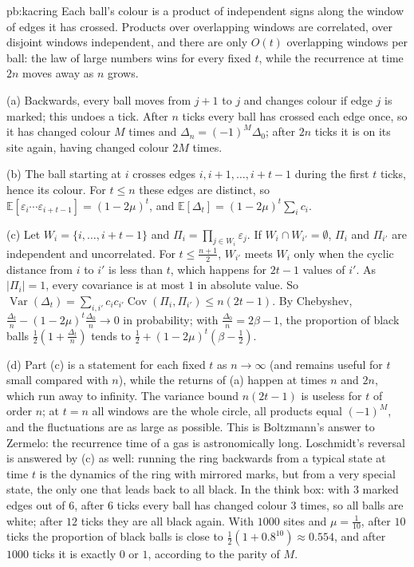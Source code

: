 \begin{solution}{pb:kacring}
\idea Each ball's colour is a product of independent signs along the window of edges it has crossed. Products over overlapping windows
are correlated, over disjoint windows independent, and there are only $O(t)$ overlapping windows per ball: the law of large numbers wins
for every fixed $t$, while the recurrence at time $2n$ moves away as $n$ grows.

\writeup (a) Backwards, every ball moves from $j+1$ to $j$ and changes colour if edge $j$ is marked; this undoes a tick. After $n$ ticks every ball has
crossed each edge once, so it has changed colour $M$ times and $\Delta_n=(-1)^M\Delta_0$; after $2n$ ticks it is on its site again, having changed colour $2M$ times.

(b) The ball starting at $i$ crosses edges $i,i+1,\dots,i+t-1$ during the first $t$ ticks, hence its colour. For $t\le n$ these edges are distinct, so
$\mathbb E[\varepsilon_i\cdots\varepsilon_{i+t-1}]=(1-2\mu)^t$, and $\mathbb E[\Delta_t]=(1-2\mu)^t\sum_ic_i$.

(c) Let $W_i=\{i,\dots,i+t-1\}$ and $\Pi_i=\prod_{j\in W_i}\varepsilon_j$. If $W_i\cap W_{i'}=\emptyset$, $\Pi_i$ and $\Pi_{i'}$ are independent and uncorrelated. For $t\le\frac{n+1}2$, $W_{i'}$ meets $W_i$ only when
the cyclic distance from $i$ to $i'$ is less than $t$, which happens for $2t-1$ values of $i'$. As $|\Pi_i|=1$, every covariance is at most $1$ in absolute value. So
$\operatorname{Var}(\Delta_t)=\sum_{i,i'}c_ic_{i'}\operatorname{Cov}(\Pi_i,\Pi_{i'})\le n(2t-1)$. By Chebyshev, $\frac{\Delta_t}n-(1-2\mu)^t\frac{\Delta_0}n\to0$ in probability; with $\frac{\Delta_0}n=2\beta-1$, the proportion of black
balls $\frac12(1+\frac{\Delta_t}n)$ tends to $\frac12+(1-2\mu)^t(\beta-\frac12)$.

(d) Part (c) is a statement for each fixed $t$ as $n\to\infty$ (and remains useful for $t$ small compared with $n$), while the returns of (a) happen at
times $n$ and $2n$, which run away to infinity. The variance bound $n(2t-1)$ is useless for $t$ of order $n$; at $t=n$ all windows are the whole
circle, all products equal $(-1)^M$, and the fluctuations are as large as possible. This is Boltzmann's answer to Zermelo: the
recurrence time of a gas is astronomically long. Loschmidt's reversal is answered by (c) as well: running the ring backwards from a
typical state at time $t$ is the dynamics of the ring with mirrored marks, but from a very special state, the only one that leads
back to all black. In the think box: with $3$ marked edges out of $6$, after $6$ ticks every ball has changed colour $3$ times, so all balls are
white; after $12$ ticks they are all black again. With $1000$ sites and $\mu=\frac1{10}$, after $10$ ticks the proportion of black balls is close to
$\frac12(1+0.8^{10})\approx0.554$, and after $1000$ ticks it is exactly $0$ or $1$, according to the parity of $M$.


\end{solution}
